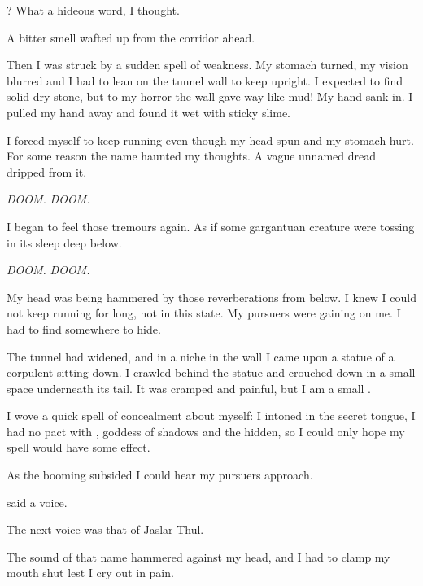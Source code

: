 \documentclass
  [a4paper,
   12pt,
   oneside
  ]%
  {article}
\begin{document}
\emph{\Ubloth{}}? 
What a hideous word, I thought. 

A bitter smell wafted up from the corridor ahead.

Then I was struck by a sudden spell of weakness.
My stomach turned, my vision blurred and I had to lean on the tunnel wall to keep upright.
I expected to find solid dry stone, but to my horror the wall gave way like mud! 
My hand sank in. 
I pulled my hand away and found it wet with sticky slime. 

I forced myself to keep running even though my head spun and my stomach hurt. 
For some reason the name \emph{\Ubloth} haunted my thoughts. 
A vague unnamed dread dripped from it.

\emph{DOOM.}
\emph{DOOM.}

I began to feel those tremours again.
As if some gargantuan creature were tossing in its sleep deep below.

\emph{DOOM.} 
\emph{DOOM.}

My head was being hammered by those reverberations from below. 
I knew I could not keep running for long, not in this state. 
My pursuers were gaining on me. 
I had to find somewhere to hide. 

The tunnel had widened, and in a niche in the wall I came upon a statue of a corpulent \scatha sitting down. 
I crawled behind the statue and crouched down in a small space underneath its tail.
It was cramped and painful, but I am a small \scatha. 

I wove a quick spell of concealment about myself:
 I intoned in the secret \Draconic tongue, 
I had no pact with \Nasshikerr, goddess of shadows and the hidden, so I could only hope my spell would have some effect. 

As the booming subsided I could hear my pursuers approach.

 said a voice.

The next voice was that of Jaslar Thul.

The sound of that name hammered against my head, and I had to clamp my mouth shut lest I cry out in pain.
\end{document}

